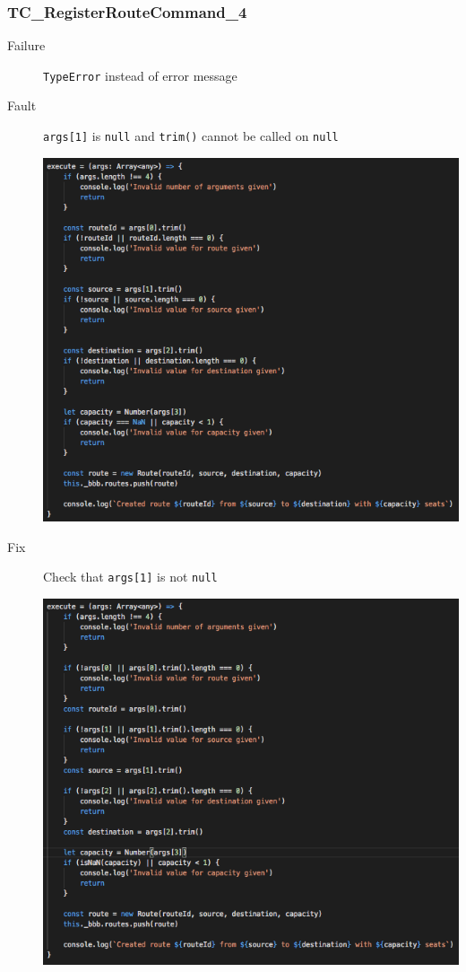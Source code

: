 \documentclass[11pt]{article}
\begin{document}
\subsubsection{TC\_RegisterRouteCommand\_4}
\label{sec:orgea09dde}

\begin{description}
\item[{Failure}] \texttt{TypeError} instead of error message
\item[{Fault}] \texttt{args[1]} is \texttt{null} and \texttt{trim()} cannot be called on \texttt{null}
\begin{center}
\includegraphics[width=.9\linewidth]{./Iteration3.rtfd/Pasted Graphic 7.tiff.png}
\end{center}
\item[{Fix}] Check that \texttt{args[1]} is not \texttt{null}
\begin{center}
\includegraphics[width=.9\linewidth]{./Iteration3.rtfd/Pasted Graphic 14.tiff.png}
\end{center}
\end{description}
\end{document}

